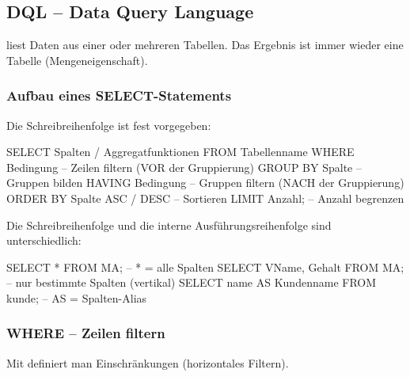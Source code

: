\subsection{DQL -- Data Query Language}
 liest Daten aus einer oder mehreren Tabellen. Das Ergebnis ist immer wieder eine Tabelle (Mengeneigenschaft).

\subsubsection{Aufbau eines SELECT-Statements}
Die Schreibreihenfolge ist fest vorgegeben:
\begin{syntaxbox}[SQL]
SELECT   Spalten / Aggregatfunktionen
FROM     Tabellenname
WHERE    Bedingung          -- Zeilen filtern (VOR der Gruppierung)
GROUP BY Spalte             -- Gruppen bilden
HAVING   Bedingung          -- Gruppen filtern (NACH der Gruppierung)
ORDER BY Spalte ASC / DESC  -- Sortieren
LIMIT    Anzahl;            -- Anzahl begrenzen
\end{syntaxbox}

Die Schreibreihenfolge und die interne Ausführungsreihenfolge sind unterschiedlich:


\begin{syntaxbox}[SQL]
SELECT * FROM MA;                -- * = alle Spalten
SELECT VName, Gehalt FROM MA;    -- nur bestimmte Spalten (vertikal)
SELECT name AS Kundenname FROM kunde;  -- AS = Spalten-Alias
\end{syntaxbox}

\subsubsection{WHERE -- Zeilen filtern}
Mit  definiert man Einschränkungen (horizontales Filtern).

